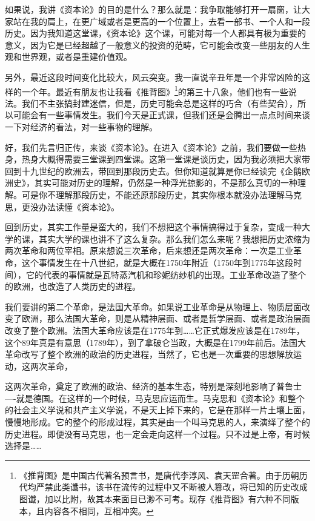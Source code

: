 \documentclass[UTF8, 12pt, a4paper]{ctexrep}
\begin{document}
如果说，我讲《资本论》的目的是什么？那么就是：我争取能够打开一扇窗，让大家站在我的肩上，在更广域或者是更高的一个位置上，去看一部书、一个人和一段历史。因为我知道这堂课，《资本论》这个课，可能对每一个人都具有极为重要的意义，因为它是已经超越了一般意义的投资的范畴，它可能会改变一些朋友的人生观和世界观，或者是重建价值观。

另外，最近这段时间变化比较大，风云突变。我一直说辛丑年是一个非常凶险的这样的一个年。最近有朋友也让我看《推背图》\footnote{《推背图》是中国古代著名预言书，是唐代李淳风、袁天罡合著。由于历朝历代均严禁此类谶书，该书在流传的过程中又不断被人篡改，将已知的历史改成图谶，加以比附，故其本来面目已渺不可考。现存《推背图》有六种不同版本，且内容各不相同，互相冲突。}的第三十八象，他们也有一些说法。我们不主张搞封建迷信，但是，历史可能会总是这样的巧合（有些契合），所以可能会有一些事情发生。我们今天是正式课，但我们还是会腾出一点点时间来谈一下对经济的看法，对一些事物的理解。

好，我们先言归正传，来谈《资本论》。在进入《资本论》之前，我们要做一些热身，热身大概得需要三堂课到四堂课。这第一堂课是谈历史，因为我必须把大家带回到十九世纪的欧洲去，带回到那段历史去。但你知道就算是你已经读完《企鹅欧洲史》，其实可能对历史的理解，仍然是一种浮光掠影的，不是那么真切的一种理解。可是你不理解那段历史，不能还原那段历史，其实你根本就没办法理解马克思，更没办法读懂《资本论》。

回到历史，其实工作量是蛮大的，我们不想把这个事情搞得过于复杂，变成一种大学的课，其实大学的课也讲不了这么复杂。那么我们怎么来呢？我想把历史浓缩为两次革命和两位宰相。原来想说三次革命，后来想还是两次革命：一次是工业革命，这个事情发生在十八世纪，就是大概在1750年附近（1750年到1775年这段时间），它的代表的事情就是瓦特蒸汽机和珍妮纺纱机的出现。工业革命改造了整个的欧洲，也改造了人类历史的进程。

我们要讲的第二个革命，是法国大革命。如果说工业革命是从物理上、物质层面改变了欧洲，那么法国大革命，则是从精神层面、或者是哲学层面、或者是政治层面改变了整个欧洲。法国大革命应该是在1775年到……它正式爆发应该是在1789年，这个89年真是有意思（1789年），到了拿破仑当政，大概是在1799年前后。法国大革命改写了整个欧洲的政治的历史进程，当然了，它也是一次重要的思想解放运动，这两次革命，

这两次革命，奠定了欧洲的政治、经济的基本生态，特别是深刻地影响了普鲁士----就是德国。在这样的一个时候，马克思应运而生。马克思和《资本论》和整个的社会主义学说和共产主义学说，不是天上掉下来的，它是在那样一片土壤上面，慢慢地形成。它的整个的形成过程，其实是由一个叫马克思的人，来演绎了整个的历史进程。即便没有马克思，也一定会走向这样一个过程。只不过是上帝，有时候选择是……
\end{document}
